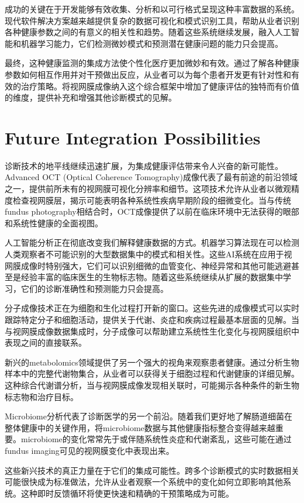 \documentclass[
  Letterpaper,
]{scrbook}
\begin{document}
成功的关键在于开发能够有效收集、分析和以可行格式呈现这种丰富数据的系统。现代软件解决方案越来越提供复杂的数据可视化和模式识别工具，帮助从业者识别各种健康参数之间的有意义的相关性和趋势。随着这些系统继续发展，融入人工智能和机器学习能力，它们检测微妙模式和预测潜在健康问题的能力只会提高。

最终，这种健康监测的集成方法使个性化医疗更加微妙和有效。通过了解各种健康参数如何相互作用并对干预做出反应，从业者可以为每个患者开发更有针对性和有效的治疗策略。将视网膜成像纳入这个综合框架中增加了健康评估的独特而有价值的维度，提供补充和增强其他诊断模式的见解。

\section{Future Integration
Possibilities}\label{future-integration-possibilities}

诊断技术的地平线继续迅速扩展，为集成健康评估带来令人兴奋的新可能性。Advanced
OCT (Optical Coherence
Tomography)成像代表了最有前途的前沿领域之一，提供前所未有的视网膜可视化分辨率和细节。这项技术允许从业者以微观精度检查视网膜层，揭示可能表明各种系统性疾病早期阶段的细微变化。当与传统fundus
photography相结合时，OCT成像提供了以前在临床环境中无法获得的眼部和系统性健康的全面视图。

人工智能分析正在彻底改变我们解释健康数据的方式。机器学习算法现在可以检测人类观察者不可能识别的大型数据集中的模式和相关性。这些AI系统在应用于视网膜成像时特别强大，它们可以识别细微的血管变化、神经异常和其他可能逃避甚至是经验丰富的临床医生的生物标志物。随着这些系统继续从扩展的数据集中学习，它们的诊断准确性和预测能力只会提高。

分子成像技术正在为细胞和生化过程打开新的窗口。这些先进的成像模式可以实时跟踪特定分子和细胞活动，提供关于代谢、炎症和疾病过程最基本层面的见解。当与视网膜成像数据集成时，分子成像可以帮助建立系统性生化变化与视网膜组织中表现之间的直接联系。

新兴的metabolomics领域提供了另一个强大的视角来观察患者健康。通过分析生物样本中的完整代谢物集合，从业者可以获得关于细胞过程和代谢健康的详细见解。这种综合代谢谱分析，当与视网膜成像发现相关联时，可能揭示各种条件的新生物标志物和治疗目标。

Microbiome分析代表了诊断医学的另一个前沿。随着我们更好地了解肠道细菌在整体健康中的关键作用，将microbiome数据与其他健康指标整合变得越来越重要。microbiome的变化常常先于或伴随系统性炎症和代谢紊乱，这些可能在通过fundus
imaging可见的视网膜变化中表现出来。

这些新兴技术的真正力量在于它们的集成可能性。跨多个诊断模式的实时数据相关可能很快成为标准做法，允许从业者观察一个系统中的变化如何立即影响其他系统。这种即时反馈循环将使更快速和精确的干预策略成为可能。
\end{document}
